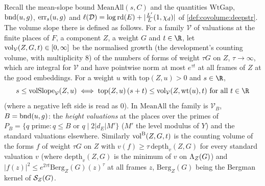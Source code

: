 Recall the mean-slope bound $\mathrm{MeanAll}(s,C)$ and the quantities $\mathrm{WtGap}$,
$\mathrm{bnd}(u,g)$, $\mathrm{err}_s(u,g)$ and $\ell(\mathcal D)=\log\mathrm{rd}(E)+|\frac{L'}{L}(1,\chi_d)|$ of
\cref{def:covolume:deepstr}. The volume slope there is defined as follows. For a family $\mathcal V$ of
valuations at the finite places of $F$, a component $Z$, a weight $G$ and $t\in\R$, let
$\mathrm{vol}_{\mathcal V}(Z,G,t)\in[0,\infty]$ be the normalised growth (the development's
counting volume, with multiplicity $8$) of the numbers of forms of weight $\tau G$ on $Z$, $\tau\to\infty$,
which are integral for $\mathcal V$ and have pointwise norm at most $e^{\tau t}$ at all frames of $Z$
at the good embeddings. For a weight $u$ with $\mathrm{top}(Z,u)>0$ and $s\in\R$,
\begin{equation}\label{pf:lift1:eq:volslope}
s\le\mathrm{volSlope}_{\mathcal V}(Z,u)\iff\mathrm{top}(Z,u)\,(s+t)\le\liftonevol_{\mathcal V}(Z,\mathrm{wt}(u),t)
\text{ for all }t\in\R
\end{equation}
(where a negative left side is read as $0$). In $\mathrm{MeanAll}$ the family is
$\mathcal V_B$, $B=\mathrm{bnd}(u,g)$: the \emph{height valuations} at the places over
the primes of $P_B=\{q\text{ prime}:q\le B\text{ or }q\mid2|d_E|M'\}$ ($M'$ the level
modulus of $Y$) and the standard valuations elsewhere. Similarly
$\mathrm{vol}^{\mathrm B}(Z,G,t)$ is the counting volume of the forms $f$ of weight $\tau G$ on $Z$ with
$v(f)\ge\tau\,\mathrm{depth}_v(Z,G)$ for every standard valuation $v$ (where $\mathrm{depth}_v(Z,G)$ is the
minimum of $v$ on $\Lambda_Z(G)$) and $|f(z)|^2\le e^{2\tau t}\mathrm{Berg}_Z(G)(z)^\tau$ at all frames
$z$, $\mathrm{Berg}_Z(G)$ being the Bergman kernel of $\mathcal S_Z(G)$.

